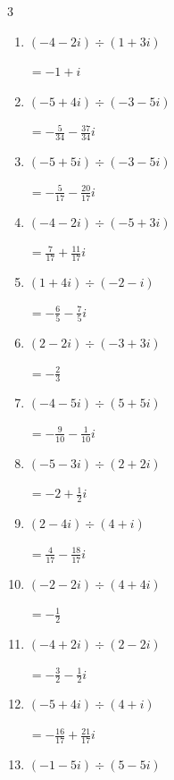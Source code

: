 \begin{multicols}{3}
\begin{enumerate}
  \item $\displaystyle (-4-2i)\div(1+3i)$

        $\displaystyle =-1+i$

  \item $\displaystyle (-5+4i)\div(-3-5i)$

        $\displaystyle =-\frac{5}{34}-\frac{37}{34}i$

  \item $\displaystyle (-5+5i)\div(-3-5i)$

        $\displaystyle =-\frac{5}{17}-\frac{20}{17}i$

  \item $\displaystyle (-4-2i)\div(-5+3i)$

        $\displaystyle =\frac{7}{17}+\frac{11}{17}i$

  \item $\displaystyle (1+4i)\div(-2-i)$

        $\displaystyle =-\frac{6}{5}-\frac{7}{5}i$

  \item $\displaystyle (2-2i)\div(-3+3i)$

        $\displaystyle =-\frac{2}{3}$

  \item $\displaystyle (-4-5i)\div(5+5i)$

        $\displaystyle =-\frac{9}{10}-\frac{1}{10}i$

  \item $\displaystyle (-5-3i)\div(2+2i)$

        $\displaystyle =-2+\frac{1}{2}i$

  \item $\displaystyle (2-4i)\div(4+i)$

        $\displaystyle =\frac{4}{17}-\frac{18}{17}i$

  \item $\displaystyle (-2-2i)\div(4+4i)$

        $\displaystyle =-\frac{1}{2}$

\columnbreak %

  \item $\displaystyle (-4+2i)\div(2-2i)$

        $\displaystyle =-\frac{3}{2}-\frac{1}{2}i$

  \item $\displaystyle (-5+4i)\div(4+i)$

        $\displaystyle =-\frac{16}{17}+\frac{21}{17}i$

  \item $\displaystyle (-1-5i)\div(5-5i)$


\end{enumerate}
\end{multicols}
